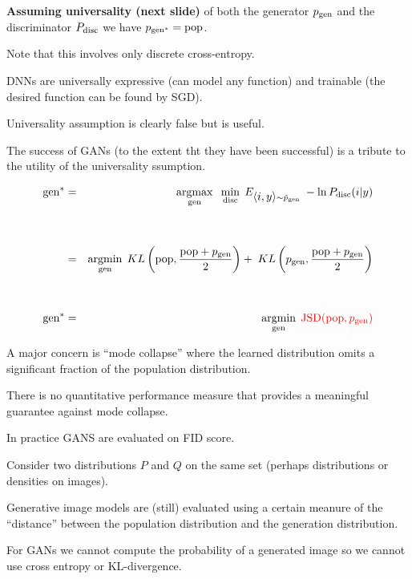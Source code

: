 {\vfill
{\bf Assuming universality (next slide)} of both the generator $p_{\mathrm{gen}}$ and the discriminator $P_{\mathrm{disc}}$ we have {\color{red} $p_{\mathrm{gen}^*} = \mathrm{pop}$}.

\vfill
Note that this involves only discrete cross-entropy.



DNNs are universally expressive (can model any function) and trainable (the desired function can be found by SGD).

\vfill
Universality assumption is clearly false but is useful.

\vfill
The success of GANs (to the extent tht they have been successful) is a tribute to the utility of the universality ssumption.



{\huge
\begin{eqnarray*}
  \mathrm{gen}^* & = & \operatorname*{argmax}_{\mathrm{gen}}\;\;\min_{\mathrm{disc}}\;E_{{\mbox{$\langle i,y\rangle$}} \sim \tilde{p}_{\mathrm{gen}}}\;-\ln P_{\mathrm{disc}}(i|y) \\
  \\
  \\
  & = & \operatorname*{argmin}_{\mathrm{gen}} \; KL\left(\mathrm{pop},\frac{\mathrm{pop}+p_{\mathrm{gen}}}{2}\right)+\;KL\left(p_{\mathrm{gen}},\frac{\mathrm{pop}+p_{\mathrm{gen}}}{2}\right) \\
  \\
  \\
  \mathrm{gen}^* & = & \operatorname*{argmin}_{\mathrm{gen}} \; {\color{red} \mathrm{JSD}(\mathrm{pop},p_{\mathrm{gen}})}
\end{eqnarray*}
}



A major concern is ``mode collapse'' where the learned distribution omits a significant fraction of the population distribution.

\vfill
There is no quantitative performance measure that provides a meaningful guarantee against mode collapse.

\vfill
In practice GANS are evaluated on FID score.


Consider two distributions $P$ and $Q$ on the same set (perhaps distributions or densities on images).

\vfill
Generative image models are (still) evaluated using a certain meanure of the ``distance'' between the population distribution
and the generation distribution.

\vfill
For GANs we cannot compute the probability of a generated image so we cannot use cross entropy or KL-divergence.

}
